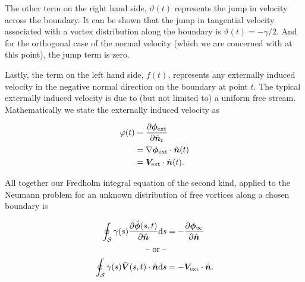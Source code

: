 The other term on the right hand side, \(\vartheta(t)\) represents the jump in velocity across the boundary.
%
It can be shown that the jump in tangential velocity associated with a vortex distribution along the boundary is \(\vartheta(t) = -\gamma/2\).
%
And for the orthogonal case of the normal velocity (which we are concerned with at this point), the jump term is zero.%
%

Lastly, the term on the left hand side, \(f(t)\), represents any externally induced velocity in the negative normal direction on the boundary at point \(t\).
%
The typical externally induced velocity is due to (but not limited to) a uniform free stream.
%
Mathematically we state the externally induced velocity as

\begin{equation}
    \begin{aligned}
    \varphi(t) &= \frac{\partial \bm{\phi}_\text{ext}}{\partial \hat{\bm{n}}_t} \\
               &= \nabla \bm{\phi}_\text{ext} \cdot \hat{\bm{n}}(t) \\
               &= \bm{V}_\text{ext} \cdot \hat{\bm{n}}(t).
    \end{aligned}
\end{equation}

All together our Fredholm integral equation of the second kind, applied to the Neumann problem for an unknown distribution of free vortices along a chosen boundary is

\begin{subequations}
    \label{eqn:fredholm2}
    \begin{align}
        \oint_\mathcal{S} \gamma(s) \frac{\partial \hat{\bm{\phi}}(s,t)}{\partial \hat{\bm{n}}} \mathrm{d} s  &= -\frac{\partial \bm{\phi}_\infty}{\partial \hat{\bm{n}}} \\
        \text{-- or --} \notag\\
        \oint_\mathcal{S} \gamma(s) \hat{\bm{V}}(s,t)\cdot\hat{\bm{n}} \mathrm{d} s  &= -\bm{V}_\text{ext}\cdot\hat{\bm{n}}.
    \end{align}
\end{subequations}

